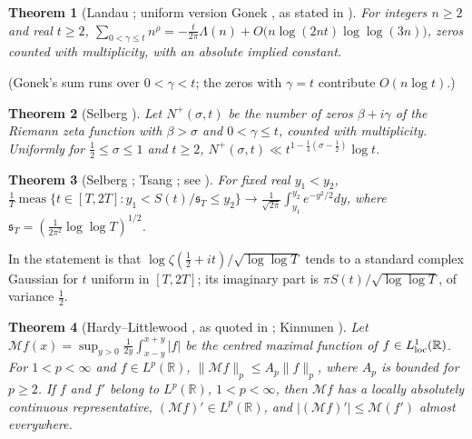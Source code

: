 \documentclass[preprint,12pt]{elsarticle}
\numberwithin{equation}{section}
\theoremstyle{plain}
\newtheorem{theorem}{Theorem}[section]
\theoremstyle{definition}
\theoremstyle{remark}
\newcommand{\R}{\mathbb R}
\begin{document}
\begin{theorem}[Landau {\cite{Landau1912}}; uniform version Gonek {\cite{Gonek1993}}, as stated in {\cite[(1.1)]{Aryan2022}}]\label{thm:known_landau}
For integers $n\ge2$ and real $t\ge2$, $\sum_{0<\gamma\le t}n^{\rho}=-\frac t{2\pi}\Lambda(n)+O\bigl(n\log(2nt)\log\log(3n)\bigr)$, zeros counted with multiplicity, with an absolute implied constant.
\end{theorem}
(Gonek's sum runs over $0<\gamma<t$; the zeros with $\gamma=t$ contribute $O(n\log t)$.)

\begin{theorem}[Selberg {\cite[Thm.~9.19(C)]{Titchmarsh1986}}]\label{thm:known_density}
Let $N^+(\sigma,t)$ be the number of zeros $\beta+i\gamma$ of the Riemann zeta function with $\beta>\sigma$ and $0<\gamma\le t$, counted with multiplicity. Uniformly for $\frac12\le\sigma\le1$ and $t\ge2$, $N^+(\sigma,t)\ll t^{1-\frac14(\sigma-\frac12)}\log t$.
\end{theorem}

\begin{theorem}[Selberg {\cite{Selberg1946a}}; Tsang {\cite{Tsang1984}}; see {\cite[(1.1)]{FazzariGerspachMinelli2025}}]\label{thm:known_selberg_clt}
For fixed real $y_1<y_2$, $\frac1T\operatorname{meas}\{t\in[T,2T]:y_1<S(t)/\mathfrak s_T\le y_2\}\to\frac1{\sqrt{2\pi}}\int_{y_1}^{y_2}e^{-y^2/2}dy$, where $\mathfrak s_T=(\frac1{2\pi^2}\log\log T)^{1/2}$.
\end{theorem}
In \cite{FazzariGerspachMinelli2025} the statement is that $\log\zeta(\frac12+it)/\sqrt{\log\log T}$ tends to a standard complex Gaussian for $t$ uniform in $[T,2T]$; its imaginary part is $\pi S(t)/\sqrt{\log\log T}$, of variance $\frac12$.

\begin{theorem}[Hardy--Littlewood {\cite[Thm.~I.1]{Stein1970}}, as quoted in {\cite[(1.2)]{Kinnunen1997}}; Kinnunen {\cite[Thm.~1.4]{Kinnunen1997}}]\label{thm:known_maximal}
Let $\mathcal Mf(x)=\sup_{y>0}\frac1{2y}\int_{x-y}^{x+y}|f|$ be the centred maximal function of $f\in L^1_{\rm loc}(\R)$. For $1<p<\infty$ and $f\in L^p(\R)$, $\|\mathcal Mf\|_p\le A_p\|f\|_p$, where $A_p$ is bounded for $p\ge2$. If $f$ and $f'$ belong to $L^p(\R)$, $1<p<\infty$, then $\mathcal Mf$ has a locally absolutely continuous representative, $(\mathcal Mf)'\in L^p(\R)$, and $|(\mathcal Mf)'|\le\mathcal M(f')$ almost everywhere.
\end{theorem}
\end{document}
